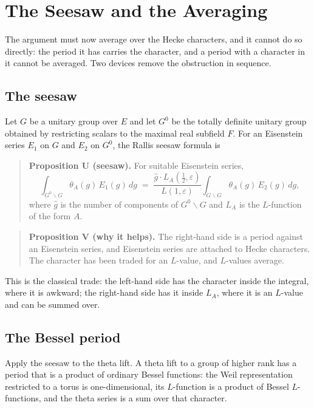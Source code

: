 
\chapter{The Seesaw and the Averaging}
\label{ch:averaging2}

The argument must now average over the Hecke characters, and it cannot do so
directly: the period it has carries the character, and a period with a
character in it cannot be averaged. Two devices remove the obstruction in
sequence.

\section{The seesaw}Let $G$ be a unitary group over $E$ and let $G^0$ be the totally definite
unitary group obtained by restricting scalars to the maximal real subfield
$F$. For an Eisenstein series $E_1$ on $G$ and $E_2$ on $G^0$, the Rallis
seesaw formula is

\begin{quote}
\textbf{Proposition U (seesaw).} For suitable Eisenstein series,
\[
\int_{G^0\backslash G} \theta_A(g)\,E_1(g)\,dg
\;=\;
\frac{\hat g \cdot L_A\!\left(\tfrac12,\varepsilon\right)}{L(1,\varepsilon)}
\int_{G\backslash G} \theta_A(g)\,E_2(g)\,dg,
\]
where $\hat g$ is the number of components of $G^0\backslash G$ and $L_A$ is
the $L$-function of the form $A$.
\end{quote}

\begin{quote}
\textbf{Proposition V (why it helps).} The right-hand side is a period against
an Eisenstein series, and Eisenstein series are attached to Hecke characters.
The character has been traded for an $L$-value, and $L$-values average.
\end{quote}

This is the classical trade: the left-hand side has the character inside the
integral, where it is awkward; the right-hand side has it inside $L_A$, where
it is an $L$-value and can be summed over.

\section{The Bessel period}Apply the seesaw to the theta lift. A theta lift to a group of higher rank has
a period that is a product of ordinary Bessel functions: the Weil
representation restricted to a torus is one-dimensional, its $L$-function is a
product of Bessel $L$-functions, and the theta series is a sum over that
character.

